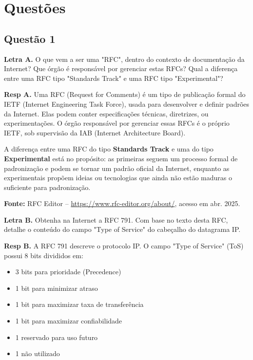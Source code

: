 \section{Questões}\label{sec:questoes}


\subsection{Questão 1}

\textbf{Letra A.} O que vem a ser uma "RFC", dentro do contexto de documentação da Internet?
Que órgão é responsável por gerenciar estas RFCs? Qual a diferença entre uma RFC
tipo "Standards Track" e uma RFC tipo "Experimental"?
\newline
    
\textbf{Resp A.} Uma RFC (Request for Comments) é um tipo de publicação formal do IETF (Internet Engineering Task Force), usada para desenvolver e definir padrões da Internet. Elas podem conter especificações técnicas, diretrizes, ou experimentações. O órgão responsável por gerenciar essas RFCs é o próprio IETF, sob supervisão da IAB (Internet Architecture Board).
\newline 

A diferença entre uma RFC do tipo \textbf{Standards Track} e uma do tipo \textbf{Experimental} está no propósito: as primeiras seguem um processo formal de padronização e podem se tornar um padrão oficial da Internet, enquanto as experimentais propõem ideias ou tecnologias que ainda não estão maduras o suficiente para padronização. 
\newline

\textbf{Fonte:} RFC Editor – \url{https://www.rfc-editor.org/about/}, acesso em abr. 2025.
\newline

\textbf{Letra B.} Obtenha na Internet a RFC 791. Com base no texto desta RFC, detalhe o
conteúdo do campo "Type of Service" do cabeçalho do datagrama IP. 
\newline

\textbf{Resp B.} A RFC 791 descreve o protocolo IP. O campo "Type of Service" (ToS) possui 8 bits divididos em:


\begin{itemize}
    \item 3 bits para prioridade (Precedence)
    \item 1 bit para minimizar atraso
    \item 1 bit para maximizar taxa de transferência
    \item 1 bit para maximizar confiabilidade
    \item 1 reservado para uso futuro
    \item 1 não utilizado
\end{itemize}

